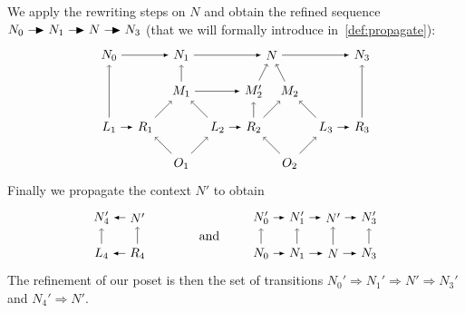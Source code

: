 \begin{example}
We apply the rewriting steps on $N$ and obtain the refined sequence $N_0\action N_1\action N\action N_3$ (that we will formally introduce in~\autoref{def:propagate}):
\[
\begin{tikzpicture} %
  \node (o1) at (0,-1) {\(O_1\)};
  \node (m1) at (0,1) {\(M_1\)};
  \node (r1) at (-1,0) {\(R_1\)};
  \node (l1) at (-2,0) {\(L_1\)};
  \node (l2) at (1,0) {\(L_2\)};
  \node (r2) at (2,0) {\(R_2\)};
  \node (o2) at (3,-1) {\(O_2\)};
  \node (m2) at (3,1) {\(M_2\)};
  \node (l3) at (4,0) {\(L_3\)};
  \node (r3) at (5,0) {\(R_3\)};
  \node (m2p) at (2,1) {\(M_2'\)};
  \node (n) at (2.5,2) {\(N\)};
  \node (n0) at (-2,2) {\(N_0\)};
  \node (n1) at (0,2) {\(N_1\)};
  \node (n3) at (5,2) {\(N_3\)};
  \draw [->] (o1) -- (r1);
  \draw [->] (o1) -- (l2);
  \draw [->] (r1) -- (m1);
  \draw [->] (l2) -- (m1);
  \draw [->] (o2) -- (r2);
  \draw [->] (o2) -- (l3);
  \draw [->] (r2) -- (m2);
  \draw [->] (l3) -- (m2);
  \draw [->] (m2) -- (n);
  \draw [->] (m2p) -- (n);
  \draw [->] (r2) -- (m2p);
  \draw [->] (l1) -- (n0);
  \draw [->] (m1) -- (n1);
  \draw [->] (r3) -- (n3);
  \draw [>=latex, ->] (l1) -- (r1);
  \draw [>=latex, ->] (l2) -- (r2);
  \draw [>=latex, ->] (l3) -- (r3);
  \draw [>=latex, ->] (m1) -- (m2p);
  \draw [>=latex, ->] (n0) -- (n1);
  \draw [>=latex, ->] (n1) -- (n);
  \draw [>=latex, ->] (n) -- (n3);
\end{tikzpicture}
\]
Finally we propagate the context $N'$ to obtain
\[
\begin{tikzpicture} %
  \node (l4) at (1,0) {\(L_4\)};
  \node (r4) at (2,0) {\(R_4\)};
  \node (n4) at (1,1) {\(N_4'\)};
  \node (m4) at (2,1) {\(N'\)};
  \node (and) at (4,0.5) { and };
  \draw [>=latex, ->] (r4) -- (l4);
  \draw [>=latex, ->] (m4) -- (n4);
  \draw [->] (r4) -- (m4);
  \draw [->] (l4) -- (n4);
\end{tikzpicture}
\qquad
\begin{tikzpicture} %
  \node (n0) at (1,0) {\(N_0\)};
  \node (n1) at (2,0) {\(N_1\)};
  \node (n) at (3,0) {\(N\)};
  \node (n3) at (4,0) {\(N_3\)};
  \node (np0) at (1,1) {\(N_0'\)};
  \node (np1) at (2,1) {\(N_1'\)};
  \node (np) at (3,1) {\(N'\)};
  \node (np3) at (4,1) {\(N_3'\)};
  \draw [>=latex, ->] (n0) -- (n1);
  \draw [>=latex, ->] (n1) -- (n);
  \draw [>=latex, ->] (n) -- (n3);
  \draw [>=latex, ->] (np0) -- (np1);
  \draw [>=latex, ->] (np1) -- (np);
  \draw [>=latex, ->] (np) -- (np3);
  \draw [->] (n0) -- (np0);
  \draw [->] (n1) -- (np1);
  \draw [->] (n) -- (np);
  \draw [->] (n3) -- (np3);
\end{tikzpicture}
\]
The refinement of our poset is then the set of transitions $N_0'\Rightarrow N_1'\Rightarrow N'\Rightarrow N_3'$ and $N_4'\Rightarrow N'$.
\end{example}

